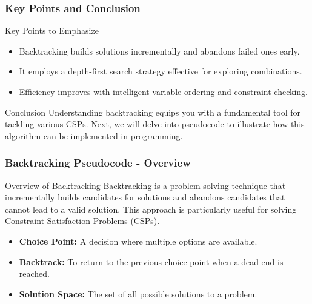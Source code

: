 \documentclass[aspectratio=169]{beamer}
\begin{document}
\begin{frame}[fragile]
    \frametitle{Key Points and Conclusion}
    \begin{block}{Key Points to Emphasize}
        \begin{itemize}
            \item Backtracking builds solutions incrementally and abandons failed ones early.
            \item It employs a depth-first search strategy effective for exploring combinations.
            \item Efficiency improves with intelligent variable ordering and constraint checking.
        \end{itemize}
    \end{block}
    
    \begin{block}{Conclusion}
        Understanding backtracking equips you with a fundamental tool for tackling various CSPs. Next, we will delve into pseudocode to illustrate how this algorithm can be implemented in programming.
    \end{block}
\end{frame}

\begin{frame}[fragile]
    \frametitle{Backtracking Pseudocode - Overview}
    \begin{block}{Overview of Backtracking}
        Backtracking is a problem-solving technique that incrementally builds candidates for solutions and abandons candidates that cannot lead to a valid solution. 
        This approach is particularly useful for solving Constraint Satisfaction Problems (CSPs).
    \end{block}
    \begin{itemize}
        \item \textbf{Choice Point:} A decision where multiple options are available.
        \item \textbf{Backtrack:} To return to the previous choice point when a dead end is reached.
        \item \textbf{Solution Space:} The set of all possible solutions to a problem.
    \end{itemize}
\end{frame}
\end{document}
